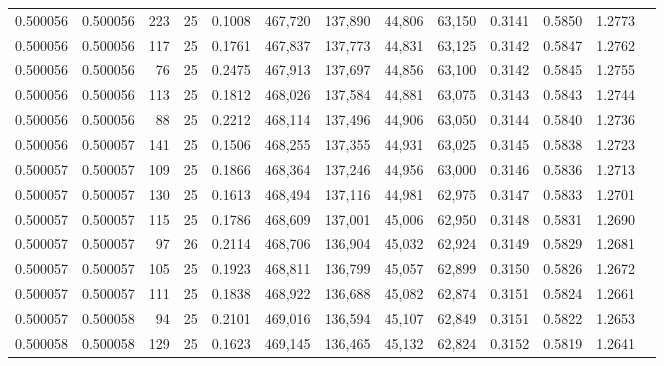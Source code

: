 \begin{tabular}{rrrrrrrrrrrrr}
0.500056 & 0.500056 &   223 &  25 &                                     0.1008 & 467,720 & 137,890 &  44,806 &  63,150 & 0.3141 & 0.5850 & 1.2773 \\
0.500056 & 0.500056 &   117 &  25 &                                     0.1761 & 467,837 & 137,773 &  44,831 &  63,125 & 0.3142 & 0.5847 & 1.2762 \\
0.500056 & 0.500056 &    76 &  25 &                                     0.2475 & 467,913 & 137,697 &  44,856 &  63,100 & 0.3142 & 0.5845 & 1.2755 \\
0.500056 & 0.500056 &   113 &  25 &                                     0.1812 & 468,026 & 137,584 &  44,881 &  63,075 & 0.3143 & 0.5843 & 1.2744 \\
0.500056 & 0.500056 &    88 &  25 &                                     0.2212 & 468,114 & 137,496 &  44,906 &  63,050 & 0.3144 & 0.5840 & 1.2736 \\
0.500056 & 0.500057 &   141 &  25 &                                     0.1506 & 468,255 & 137,355 &  44,931 &  63,025 & 0.3145 & 0.5838 & 1.2723 \\
0.500057 & 0.500057 &   109 &  25 &                                     0.1866 & 468,364 & 137,246 &  44,956 &  63,000 & 0.3146 & 0.5836 & 1.2713 \\
0.500057 & 0.500057 &   130 &  25 &                                     0.1613 & 468,494 & 137,116 &  44,981 &  62,975 & 0.3147 & 0.5833 & 1.2701 \\
0.500057 & 0.500057 &   115 &  25 &                                     0.1786 & 468,609 & 137,001 &  45,006 &  62,950 & 0.3148 & 0.5831 & 1.2690 \\
0.500057 & 0.500057 &    97 &  26 &                                     0.2114 & 468,706 & 136,904 &  45,032 &  62,924 & 0.3149 & 0.5829 & 1.2681 \\
0.500057 & 0.500057 &   105 &  25 &                                     0.1923 & 468,811 & 136,799 &  45,057 &  62,899 & 0.3150 & 0.5826 & 1.2672 \\
0.500057 & 0.500057 &   111 &  25 &                                     0.1838 & 468,922 & 136,688 &  45,082 &  62,874 & 0.3151 & 0.5824 & 1.2661 \\
0.500057 & 0.500058 &    94 &  25 &                                     0.2101 & 469,016 & 136,594 &  45,107 &  62,849 & 0.3151 & 0.5822 & 1.2653 \\
0.500058 & 0.500058 &   129 &  25 &                                     0.1623 & 469,145 & 136,465 &  45,132 &  62,824 & 0.3152 & 0.5819 & 1.2641 \\

\end{tabular}
